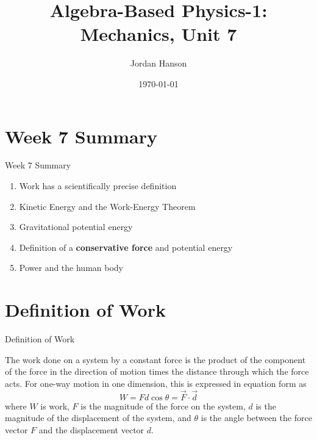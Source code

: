 \documentclass{beamer}
\title{Algebra-Based Physics-1: Mechanics, Unit 7}
\date{\today}
\author{Jordan Hanson}
\institute{Whittier College Department of Physics and Astronomy}
\begin{document}
\maketitle

\section{Week 7 Summary}

\begin{frame}{Week 7 Summary}
\begin{enumerate}
\item \alert{Work} has a scientifically precise definition
\item Kinetic Energy and the \alert{Work-Energy Theorem}
\item Gravitational potential energy
\item Definition of a \textbf{conservative force} and potential energy
\item Power and the human body
\end{enumerate}
\end{frame}

\section{Definition of Work}

\begin{frame}{Definition of Work}
\begin{tcolorbox}[colback=white,colframe=red!40!blue,title=Definition of Work]
\small
\alert{
The work done on a system by a constant force is the product of the component of the force in the direction of motion times the distance through which the force acts.  For one-way motion in one dimension, this is expressed in equation form as 
\begin{equation}
W = Fd\cos\theta = \vec{F} \cdot \vec{d}
\end{equation}
where $W$ is work, $F$ is the magnitude of the force on the system, $d$ is the magnitude of the displacement of the system, and $\theta$ is the angle between the force vector $F$ and the displacement vector $d$.
}
\end{tcolorbox}
\end{frame}
\end{document}
